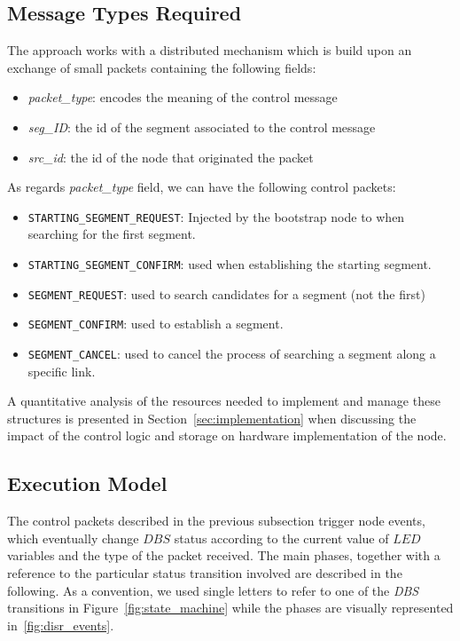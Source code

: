 \subsection{Message Types Required}

The \disr{} approach works with a distributed mechanism which is build
upon an exchange of small packets containing the following fields:
\begin{itemize}
\item \emph{packet\_type}: encodes the meaning of the control message
\item \emph{seg\_ID}: the id of the segment associated to the \disr{} control message
\item \emph{src\_id}: the id of the node that originated the packet
\end{itemize}

As regards \emph{packet\_type} field, we can have the following control packets:
\begin{itemize}
\item{\texttt{STARTING\_SEGMENT\_REQUEST}}: Injected by the bootstrap
node to when searching for the first segment. 
\item{\texttt{STARTING\_SEGMENT\_CONFIRM}}: used when establishing
the starting  segment. 
\item{\texttt{SEGMENT\_REQUEST}}: used to search candidates for a segment (not the
first)
\item{\texttt{SEGMENT\_CONFIRM}}: used to establish a segment. 
\item{\texttt{SEGMENT\_CANCEL}}: used to cancel the process of searching a segment along a
specific link.
\end{itemize}

A quantitative analysis of the resources needed to implement and
manage these structures is presented in Section~\ref{sec:implementation} when
discussing the impact of the \disr{} control logic and storage on
hardware implementation of the node.

\subsection{Execution Model}
\label{sub:phases}

The \disr{} control packets described in the previous subsection trigger
node events, which eventually change $DBS$ status according to the
current value of $LED$ variables and the type of the packet received.
The main \disr{} phases, together with a reference to the particular
status transition involved are described in the following. As a
convention, we used single letters to refer to one of the \emph{DBS} transitions in
Figure~\ref{fig:state_machine} while the phases are visually
represented in~\ref{fig:disr_events}.

